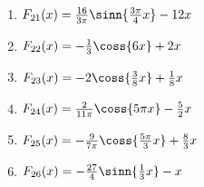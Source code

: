 \begin{Answer}[ref=trigStammfunktionA1]
\begin{minipage}{\textwidth}
{\begin{minipage}{0.5\linewidth}
\begin{enumerate}[label=\alph*)]
					\item \(F_{21}(x)=\frac{16}{3\pi}\sinn{\frac{3\pi}{4}x}-12x\)
					\item \(F_{22}(x)=-\frac{1}{3}\coss{6x}+2x\)
					\item \(F_{23}(x)=-2\coss{\frac{3}{8}x}+\frac{1}{8}x\)
					\item \(F_{24}(x)=\frac{2}{11\pi}\coss{5\pi x}-\frac{5}{2}x\)
					\item \(F_{25}(x)=-\frac{9}{7\pi}\coss{\frac{5\pi}{3}x}+\frac{8}{3}x\)
					\item \(F_{26}(x)=-\frac{27}{4}\sinn{\frac{1}{3}x}-x\)
				\end{enumerate}
		\end{minipage}}
	\end{minipage}
\end{Answer}